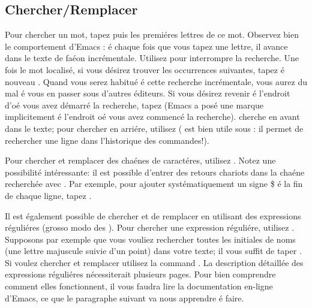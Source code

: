 \subsection{Chercher/Remplacer}

Pour chercher un mot, tapez   puis les premi\'eres lettres
de ce mot. Observez bien le comportement d'Emacs : \'e chaque fois que
vous tapez une lettre, il avance dans le texte de fa\'eon
incr\'ementale. Utilisez   pour interrompre la recherche.
Une fois le mot localis\'e, si vous d\'esirez trouver les occurrences
suivantes, tapez \'e nouveau  . Quand vous serez habitu\'e \'e
cette recherche incr\'ementale, vous aurez du mal \'e vous en passer
sous d'autres \'editeurs. Si vous d\'esirez revenir \'e l'endroit d'o\'e
vous avez d\'emarr\'e la recherche, tapez  
(Emacs a pos\'e une marque implicitement \'e l'endroit o\'e vous avez
commenc\'e la recherche).   cherche en avant dans le texte;
pour chercher en arri\'ere, utilisez   (  est bien
utile sous : il permet de rechercher une ligne dans
l'historique des commandes!).

Pour chercher et remplacer des cha\'enes de caract\'eres, utilisez
. Notez une possibilit\'e int\'eressante: il est possible
d'entrer des retours chariots dans la cha\'ene recherch\'ee avec
. Par exemple, pour ajouter syst\'ematiquement un signe
\$ \'e la fin de chaque ligne, tapez 
   .

Il est \'egalement possible de chercher et de remplacer en utilisant
des expressions r\'eguli\'eres (grosso modo des ). Pour
chercher une expression r\'eguli\'ere, utilisez . Supposons
par exemple que vous vouliez rechercher toutes les initiales de noms
(une lettre majuscule suivie d'un point) dans votre texte; il vous
suffit de taper     \code{[A-Z]}. Si voulez
chercher et remplacer utilisez la command . La description d\'etaill\'ee des expressions
r\'eguli\'eres n\'ecessiterait plusieurs pages. Pour bien comprendre
comment elles fonctionnent, il vous faudra lire la documentation
en-ligne d'Emacs, ce que le paragraphe suivant va nous apprendre \'e
faire.


